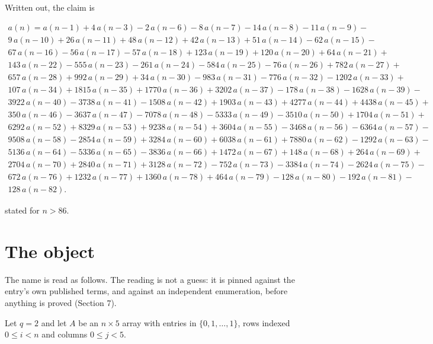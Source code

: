 \documentclass[11pt]{article}
\theoremstyle{definition}
\begin{document}
Written out, the claim is

\begin{multline*} a(n) = a(n-1) + 4\,a(n-3) - 2\,a(n-6) - 8\,a(n-7) - 14\,a(n-8) - 11\,a(n-9) - \\ 9\,a(n-10) + 26\,a(n-11) + 48\,a(n-12) + 42\,a(n-13) + 51\,a(n-14) - 62\,a(n-15) - \\ 67\,a(n-16) - 56\,a(n-17) - 57\,a(n-18) + 123\,a(n-19) + 120\,a(n-20) + 64\,a(n-21) + \\ 143\,a(n-22) - 555\,a(n-23) - 261\,a(n-24) - 584\,a(n-25) - 76\,a(n-26) + 782\,a(n-27) + \\ 657\,a(n-28) + 992\,a(n-29) + 34\,a(n-30) - 983\,a(n-31) - 776\,a(n-32) - 1202\,a(n-33) + \\ 107\,a(n-34) + 1815\,a(n-35) + 1770\,a(n-36) + 3202\,a(n-37) - 178\,a(n-38) - 1628\,a(n-39) - \\ 3922\,a(n-40) - 3738\,a(n-41) - 1508\,a(n-42) + 1903\,a(n-43) + 4277\,a(n-44) + 4438\,a(n-45) + \\ 350\,a(n-46) - 3637\,a(n-47) - 7078\,a(n-48) - 5333\,a(n-49) - 3510\,a(n-50) + 1704\,a(n-51) + \\ 6292\,a(n-52) + 8329\,a(n-53) + 9238\,a(n-54) + 3604\,a(n-55) - 3468\,a(n-56) - 6364\,a(n-57) - \\ 9508\,a(n-58) - 2854\,a(n-59) + 3284\,a(n-60) + 6038\,a(n-61) + 7880\,a(n-62) - 1292\,a(n-63) - \\ 5136\,a(n-64) - 5336\,a(n-65) - 3836\,a(n-66) + 1472\,a(n-67) + 148\,a(n-68) + 264\,a(n-69) + \\ 2704\,a(n-70) + 2840\,a(n-71) + 3128\,a(n-72) - 752\,a(n-73) - 3384\,a(n-74) - 2624\,a(n-75) - \\ 672\,a(n-76) + 1232\,a(n-77) + 1360\,a(n-78) + 464\,a(n-79) - 128\,a(n-80) - 192\,a(n-81) - \\ 128\,a(n-82). \end{multline*}

stated for $n > 86$.

\section{The object}

The name is read as follows. The reading is not a guess: it is pinned against the entry's own published terms, and against an independent enumeration, before anything is proved (Section 7).

Let $q = 2$ and let $A$ be an $n \times 5$ array with entries in $\{0,1,\dots,1\}$, rows indexed $0 \le i < n$ and columns $0 \le j < 5$.
\end{document}
